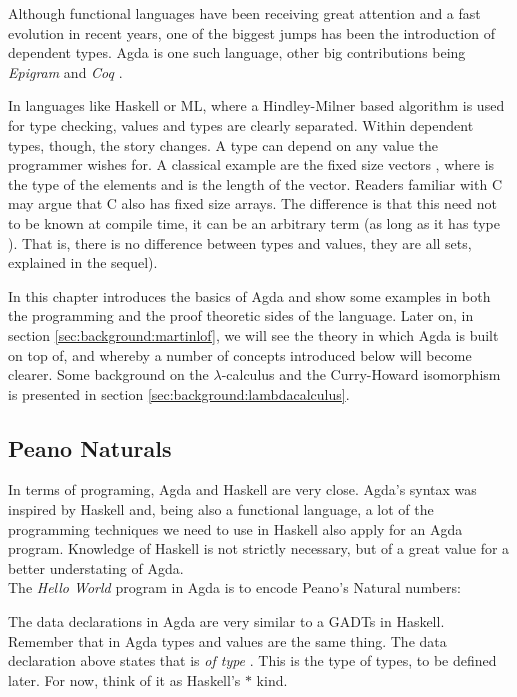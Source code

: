 Although functional languages have been receiving great attention
and a fast evolution in recent years, one of the biggest jumps
has been the introduction of dependent types. Agda\cite{norell07} is one such language, other 
big contributions being \emph{Epigram} \cite{mcbride05} and \emph{Coq} \cite{bertot06}. 

In languages like Haskell or ML, where a Hindley-Milner based algorithm is used
for type checking, values and types are clearly separated. Within dependent
types, though, the story changes. A type can depend on any value the programmer
wishes for. A classical example are the fixed size vectors , where 
is the type of the elements and  is the length of the vector. Readers familiar
with C may argue that C also has fixed size arrays. The difference is that
this  need not to be known at compile time, it can be an arbitrary term (as long
as it has type ). That is, there is no difference between types and values,
they are all sets, explained in the sequel).

In this chapter introduces the basics of Agda and show some examples in both
the programming and the proof theoretic sides of the language. Later on, in 
section \ref{sec:background:martinlof}, we will see the theory in which Agda is built 
on top of, and whereby a number of concepts introduced below will become clearer. 
Some background on the $\lambda$-calculus and the Curry-Howard isomorphism is
presented in section \ref{sec:background:lambdacalculus}.

\subsection{Peano Naturals}

In terms of programing, Agda and Haskell are very close. Agda's syntax was
inspired by Haskell and, being also a functional language, a lot of
the programming techniques we need to use in Haskell also apply for an Agda program.
Knowledge of Haskell is not strictly necessary, but of a great value for a better
understating of Agda.\\

The \emph{Hello World} program in Agda is to encode Peano's Natural numbers:


The data declarations in Agda are very similar to a GADTs\cite{Xi2003} in Haskell. Remember that in Agda types and values are the same thing.
The data declaration above states that  is \emph{of type} 
. This  is the type of types, to be defined later. 
For now, think of it as Haskell's $*$ kind.


